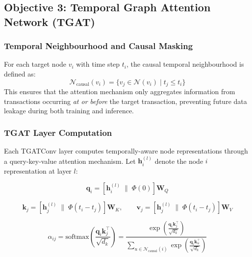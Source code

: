 \subsection{Objective 3: Temporal Graph Attention Network (TGAT)}
\label{subsec:tgat}

\subsubsection{Temporal Neighbourhood and Causal Masking}

For each target node $v_i$ with time step $t_i$, the causal temporal neighbourhood is defined as:
\begin{equation}
\mathcal{N}_{\text{causal}}(v_i) = \{ v_j \in \mathcal{N}(v_i) \mid t_j \leq t_i \}
\label{eq:causal_neighborhood}
\end{equation}
This ensures that the attention mechanism only aggregates information from transactions occurring \textit{at or before} the target transaction, preventing future data leakage during both training and inference.

\subsubsection{TGAT Layer Computation}

Each TGATConv layer computes temporally-aware node representations through a query-key-value attention mechanism. Let $\mathbf{h}_i^{(l)}$ denote the node $i$ representation at layer $l$:

\begin{equation}
\mathbf{q}_i = \left[\mathbf{h}_i^{(l)} \;\big\|\; \Phi(0)\right] \mathbf{W}_Q
\label{eq:query}
\end{equation}

\begin{equation}
\mathbf{k}_j = \left[\mathbf{h}_j^{(l)} \;\big\|\; \Phi(t_i - t_j)\right] \mathbf{W}_K, \qquad \mathbf{v}_j = \left[\mathbf{h}_j^{(l)} \;\big\|\; \Phi(t_i - t_j)\right] \mathbf{W}_V
\label{eq:key_value}
\end{equation}

\begin{equation}
\alpha_{ij} = \text{softmax}\left( \frac{\mathbf{q}_i \mathbf{k}_j^\top}{\sqrt{d_k}} \right) = \frac{\exp\!\left( \frac{\mathbf{q}_i \mathbf{k}_j^\top}{\sqrt{d_k}} \right)}{\sum_{u \in \mathcal{N}_{\text{causal}}(i)} \exp\!\left( \frac{\mathbf{q}_i \mathbf{k}_u^\top}{\sqrt{d_k}} \right)}
\label{eq:attention}
\end{equation}

